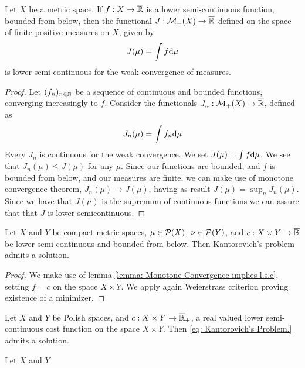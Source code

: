 \begin{lemma}
	Let $X$ be a metric space. If $f:X\rightarrow\overline{\mathbb{R}}$ is a lower semi-continuous function, bounded from below, then the functional  $J:\mathcal{M}_+(X)\rightarrow \overline{\mathbb{R}}$ defined on the space of finite positive measures on $X$, given by
	\begin{equation*}
		J(\mu)=\int f \mathrm{d}\mu
	\end{equation*} 
	is lower semi-continuous for the weak convergence of measures. \label{lemma: Monotone Convergence implies l.s.c}
\end{lemma}
\begin{proof}
	Let $(f_n)_{n\in \mathbb{N}}$ be a sequence of continuous and bounded functions, converging increasingly to $f$. Consider the functionals $J_n: \mathcal{M}_+(X)\rightarrow\overline{\mathbb{R}}$, defined as
	\begin{equation*}
			J_n(\mu)=\int f_n \mathrm{d}\mu
	\end{equation*}	
	Every $J_n$ is continuous for the weak convergence. We set $J(\mu)=\int f \mathrm{d}\mu$. We see that $J_n(\mu) \leq J(\mu)$ for any $\mu$. Since our functions are bounded, and $f$ is bounded from below, and our measures are finite, we can make use of monotone convergence theorem, $J_n(\mu)\rightarrow J(\mu)$, having as result $J(\mu)=\sup_{n} J_n(\mu)$. Since we have that $J(\mu)$ is the supremum of continuous functions we can assure that that $J$ is lower semicontinuous.
\end{proof}
\begin{theorem}
	Let $X$ and $Y$ be compact metric spaces, $\mu \in \mathcal{P}(X)$, $\nu \in\mathcal{P}(Y)$, and $c:X\times Y\rightarrow \overline{\mathbb{R}} $  be lower semi-continuous and bounded from below. Then Kantorovich's problem admits a solution.
\end{theorem}

\begin{proof}
We make use of lemma \ref{lemma: Monotone Convergence implies l.s.c}, setting $f=c$ on the space $X\times Y$. We apply again Weierstrass criterion proving existence of a minimizer.
\end{proof}

\begin{theorem}
Let $X$ and $Y$ be Polish spaces, and $c:X\times Y \rightarrow \overline{\mathbb{R}}_+$, a real valued lower semi-continuous cost function on the space $X\times Y$. Then \eqref{eq: Kantorovich's Problem.} admits a solution.
\end{theorem}

\begin{lemma}
	Let $X$ and $Y$ 
\end{lemma}

